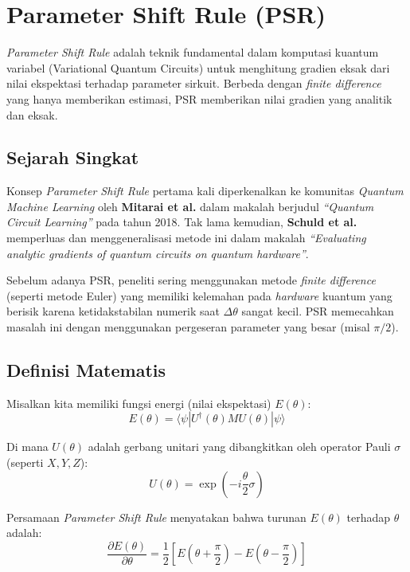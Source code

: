 \section{Parameter Shift Rule (PSR)}\label{appendix-f}

\emph{Parameter Shift Rule} adalah teknik fundamental dalam komputasi kuantum variabel (Variational Quantum Circuits) untuk menghitung gradien eksak dari nilai ekspektasi terhadap parameter sirkuit. Berbeda dengan \emph{finite difference} yang hanya memberikan estimasi, PSR memberikan nilai gradien yang analitik dan eksak.

\hypertarget{sejarah-singkat}{%
\subsection{Sejarah Singkat}\label{sejarah-singkat}}

Konsep \emph{Parameter Shift Rule} pertama kali diperkenalkan ke komunitas \emph{Quantum Machine Learning} oleh \textbf{Mitarai et al.} dalam makalah berjudul \emph{``Quantum Circuit Learning''} pada tahun 2018. Tak lama kemudian, \textbf{Schuld et al.} memperluas dan menggeneralisasi metode ini dalam makalah \emph{``Evaluating analytic gradients of quantum circuits on quantum hardware''}.

Sebelum adanya PSR, peneliti sering menggunakan metode \emph{finite difference} (seperti metode Euler) yang memiliki kelemahan pada \emph{hardware} kuantum yang berisik karena ketidakstabilan numerik saat \(\Delta \theta\) sangat kecil. PSR memecahkan masalah ini dengan menggunakan pergeseran parameter yang besar (misal \(\pi/2\)).

\hypertarget{definisi-matematis}{%
\subsection{Definisi Matematis}\label{definisi-matematis}}

Misalkan kita memiliki fungsi energi (nilai ekspektasi) \(E(\theta)\): \[E(\theta) = \langle \psi | U^\dagger(\theta) M U(\theta) | \psi \rangle\]

Di mana \(U(\theta)\) adalah gerbang unitari yang dibangkitkan oleh operator Pauli \(\sigma\) (seperti \(X, Y, Z\)): \[U(\theta) = \exp\left(-i \frac{\theta}{2} \sigma\right)\]

Persamaan \emph{Parameter Shift Rule} menyatakan bahwa turunan \(E(\theta)\) terhadap \(\theta\) adalah: \[\frac{\partial E(\theta)}{\partial \theta} = \frac{1}{2} \left[ E\left(\theta + \frac{\pi}{2}\right) - E\left(\theta - \frac{\pi}{2}\right) \right]\]

